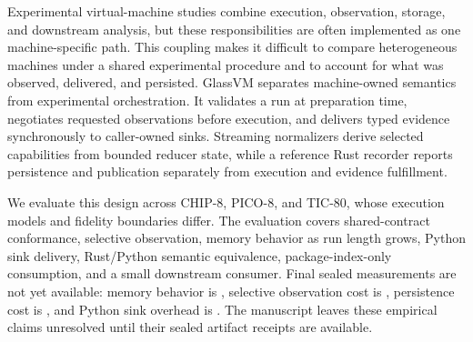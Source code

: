 Experimental virtual-machine studies combine execution, observation, storage,
and downstream analysis, but these responsibilities are often implemented as
one machine-specific path. This coupling makes it difficult to compare
heterogeneous machines under a shared experimental procedure and to account
for what was observed, delivered, and persisted. GlassVM separates
machine-owned semantics from experimental orchestration. It validates a run
at preparation time, negotiates requested observations before execution, and
delivers typed evidence synchronously to caller-owned sinks. Streaming
normalizers derive selected capabilities from bounded reducer state, while a
reference Rust recorder reports persistence and publication separately from
execution and evidence fulfillment.

We evaluate this design across CHIP-8, PICO-8, and TIC-80, whose execution
models and fidelity boundaries differ. The evaluation covers shared-contract
conformance, selective observation, memory behavior as run length grows,
Python sink delivery, Rust/Python semantic equivalence, package-index-only
consumption, and a small downstream consumer. Final sealed measurements are
not yet available: memory behavior is \TBAMemoryResult, selective observation
cost is \TBAOverheadResult, persistence cost is \TBAStorageResult, and Python
sink overhead is \TBAPythonSinkResult. The manuscript leaves these empirical
claims unresolved until their sealed artifact receipts are available.
